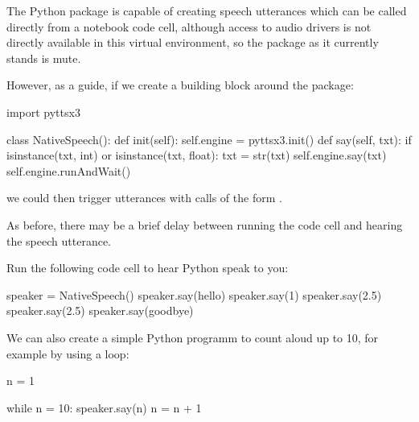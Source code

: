 \documentclass[letterpaper,10pt,english]{sphinxmanual}
\begin{document}
The Python  package is capable of creating speech utterances which can be called directly from a notebook code cell, although access to audio drivers is not directly available in this virtual environment, so the package as it currently stands is mute.

However, as a guide, if we create a building block around the package:

{
\begin{sphinxVerbatim}[commandchars=\\\{\}]
\llap{\color{nbsphinxin}[ ]:\,\hspace{\fboxrule}\hspace{\fboxsep}}import pyttsx3

class NativeSpeech():
    def \PYGZus{}\PYGZus{}init\PYGZus{}\PYGZus{}(self):
        self.engine = pyttsx3.init()
    def say(self, txt):
        if isinstance(txt, int) or isinstance(txt, float):
            txt = str(txt)
        self.engine.say(txt)
        self.engine.runAndWait()
\end{sphinxVerbatim}
}

we could then trigger utterances with calls of the form .

As before, there may be a brief delay between running the code cell and hearing the speech utterance.

Run the following code cell to hear Python speak to you:

{
\begin{sphinxVerbatim}[commandchars=\\\{\}]
\llap{\color{nbsphinxin}[ ]:\,\hspace{\fboxrule}\hspace{\fboxsep}}speaker = NativeSpeech()
speaker.say(\PYGZsq{}hello\PYGZsq{})
speaker.say(1)
speaker.say(\PYGZdq{}2.5\PYGZdq{})
speaker.say(2.5)
speaker.say(\PYGZsq{}goodbye\PYGZsq{})
\end{sphinxVerbatim}
}

We can also create a simple Python programm to count aloud up to 10, for example by using a  loop:

{
\begin{sphinxVerbatim}[commandchars=\\\{\}]
\llap{\color{nbsphinxin}[ ]:\,\hspace{\fboxrule}\hspace{\fboxsep}}n = 1

while n \PYGZlt{}= 10:
    speaker.say(n)
    n = n + 1
\end{sphinxVerbatim}
}
\end{document}

